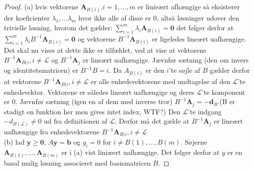 %
\begin{proof}

(a) hvis vektorene $\mathbf{A}_{B(i)}$,$i=1,\ldots,m$ er linieært afhængige så eksisterer der koeficienter $\lambda_1,\ldots \lambda_m$ hvor ikke alle af disse er $0$, altså løsninger udover den trivielle løsning, hvorom det gælder:
$ \sum_{i=1}^m \lambda_i \mathbf{A}_{B(i)}=\mathbf{0} $ det følger derfor at $\sum_{i=1}^m \lambda_i B^{-1}\mathbf{A}_{B(i)}=\mathbf{0}$ og vektorene $B^{-1}\mathbf{A}_{B(i)}$ er ligeledes lineært uafhængige. Det skal nu vises at dette ikke er tilfældet, ved at vise at vektorene $B^{-1}\mathbf{A}_{B(i},i\neq \mathcal{L}$ og $B^{-1}\mathbf{A}_j$ er lineært uafhængige.
Jævnfør sætning (den om invers og identitetsmatricen) er $B^{-1}B=i$.
Da $A_{B(i)}$ er den $i$'te søjle af $B$ gælder derfor at vektorene $B^{-1}\mathbf{A}_{B(i},i\neq \mathcal{L}$  er alle enhedsvektorene med undtagelse af den $\mathcal{L}$'te enhedsvektor. 
Vektorene er således lineært uafhængige og deres  $\mathcal{L}$'te komponent er $0$.
Jævnfør sætning (igen en af dem med inverse tror) $B^{-1}\mathbf{A}_j=-\mathbf{d}_B$.(B er stadigt en funktion her men gives intet index, WTF?) 
Den $\mathcal{L}$'te indgang $-d_{B(\mathcal{L})}\neq 0$ ud fra definitionen af $\mathcal{L}$.
Derfor må det gælde at $B^{-1} \mathbf{A}_j$ er lineært uafhængige fra enhedsvektorene $B^{-1}\mathbf{A}_{B(i},i\neq \mathcal{L}$ \\
(b) lad $\mathbf{y}\geq \mathbf{0}$, $A\mathbf{y}=\mathbf{b}$ og $y_i=0$ for $i \neq B(1),\ldots,B(m)$. Søjerne $\mathbf{A}_{B(1)},\ldots,\mathbf{A}_{B(m)}$ er i (a) vist liniæert uafhængige. Det følger derfor at $y$ er en basal mulig løsning associeret med basismatricen $B$.
\end{proof}